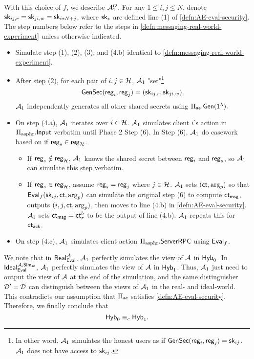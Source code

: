 With this choice of $f$, we describe $\mathcal{A}_1^O$. For any $1 \leq i, j \leq N$, denote ${\mathsf{sk}}_{ij, r} = {\mathsf{sk}}_{ji, w} = {\mathsf{sk}}_{i * N + j}$, where ${\mathsf{sk}}_{*}$ are defined line (1) of \cref{defn:AE-eval-security}. The step numbers below refer to the steps in \cref{defn:messaging-real-world-experiment} unless otherwise indicated. 
\begin{itemize}
    \item Simulate step (1), (2), (3), and (4.b) identical to \cref{defn:messaging-real-world-experiment}.
    \item After step (2), for each pair of $i, j \in \mathcal{H}$, $\mathcal{A}_1$ "set"\footnote{In other word, $\mathcal{A}_1$ simulates the honest users as if $\mathsf{GenSec}(\mathsf{reg}_i, \mathsf{reg}_j) = {\mathsf{sk}}_{ij}$. $\mathcal{A}_1$ does not have access to ${\mathsf{sk}}_{ij}$.} 
    $$\mathsf{GenSec}(\mathsf{reg}_i, \mathsf{reg}_j) = ({\mathsf{sk}}_{ij, r}, {\mathsf{sk}}_{ji, w}).$$ 
    $\mathcal{A}_1$ independently generates all other shared secrets using $\Pi_{\mathsf{ae}}.\mathsf{Gen}(1^{\lambda}).$
    \item On step (4.a), $\mathcal{A}_1$ iterates over $i \in \mathcal{H}$. $\mathcal{A}_1$ simulates client $i$'s action in $\Pi_{\text{asphr}}.\mathsf{Input}$ verbatim until Phase 2 Step (6). In Step (6), $\mathcal{A}_1$ do casework based on if $\mathsf{reg}_s \in \mathsf{reg}_{\mathcal{H}}$. 
    \begin{itemize}
        \item  If $\mathsf{reg}_s \notin \mathsf{reg}_{\mathcal{H}}$, $\mathcal{A}_1$ knows the shared secret between $\mathsf{reg}_i$ and $\mathsf{reg}_s$, so $\mathcal{A}_1$ can simulate this step verbatim.
        \item  If $\mathsf{reg}_s \in \mathsf{reg}_{\mathcal{H}}$, assume $\mathsf{reg}_s = \mathsf{reg}_j$ where $j \in \mathcal{H}$. $\mathcal{A}_1$ sets $(\mathsf{ct}, \arg_p)$ so that $\mathsf{Eval}_f({\mathsf{sk}}_{ij}, \mathsf{ct}, \arg_p)$ can simulate the original step (6) to compute $\mathsf{ct}_{\mathsf{msg}}$, outputs $(i, j, \mathsf{ct}, \arg_p)$, then moves to line (4.b) in \cref{defn:AE-eval-security}. $\mathcal{A}_1$ sets $\mathsf{ct}_{\mathsf{msg}} = \mathsf{ct}^b_r$ to be the output of line (4.b). $\mathcal{A}_1$ repeats this for $\mathsf{ct}_{\mathsf{ack}}$.
    \end{itemize}
   
    \item On step (4.c), $\mathcal{A}_1$ simulates client action $\Pi_{\text{asphr}}.\mathsf{ServerRPC}$ using $\mathsf{Eval}_f$.
\end{itemize}
We note that in $\mathsf{Real}_{\mathsf{Eval}}^{\mathcal{A}}$, $\mathcal{A}_1$ perfectly simulates the view of $\mathcal{A}$ in $\mathsf{Hyb}_0$. In $\mathsf{Ideal}_{\mathsf{Eval}}^{\mathcal{A}, \mathsf{Sim}_{\mathsf{ae}}}$, $\mathcal{A}_1$ perfectly simulates the view of $\mathcal{A}$ in $\mathsf{Hyb}_1$. Thus, $\mathcal{A}_1$ just need to output the view of $\mathcal{A}$ at the end of the simulation, and the same distinguisher $\mathcal{D}' = \mathcal{D}$ can distinguish between the views of $\mathcal{A}_1$ in the real- and ideal-world. This contradicts our assumption that $\Pi_{\mathsf{ae}}$ satisfies \cref{defn:AE-eval-security}. Therefore, we finally conclude that
$$\mathsf{Hyb}_0 \equiv_c \mathsf{Hyb}_1.$$

